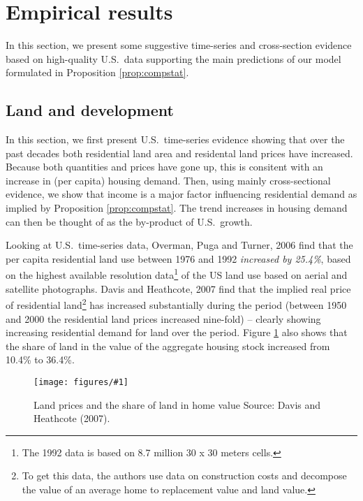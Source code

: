 \documentclass[12pt]{article}
\newcommand{\dofigure}[2]{\begin{figure}
\begin{centering}
\texttt{[image: figures/\#1]}
  \caption{#2\label{fig:#1}}
\end{centering}
\end{figure}}
\begin{document}


\section{Empirical results}\label{empirics}
In this section, we present some suggestive time-series and cross-section evidence based on high-quality U.S.~data supporting the main predictions of our model formulated in Proposition \ref{prop:compstat}.

\subsection{Land and development}
In this section, we first present U.S.~time-series evidence showing that over the past decades both residential land area and residental land prices have increased. Because both quantities and prices have gone up, this is consitent with an increase in (per capita) housing demand. Then, using mainly cross-sectional evidence, we show that income is a major factor influencing residential demand as implied by Proposition \ref{prop:compstat}. The trend increases in housing demand can then be thought of as the by-product of U.S.~growth.

Looking at U.S.~time-series data, Overman, Puga and Turner, 2006 find that the per capita residential land use between 1976 and 1992 \emph{increased by 25.4\%}, based on the highest available resolution data\footnote{The 1992 data is based on 8.7 million 30 x 30 meters cells.} of the US land use based on aerial and satellite photographs. Davis and Heathcote, 2007 find that the implied real price of residential land\footnote{To get this data, the authors use
data on construction costs and decompose the value of an
average home to replacement value and land value.} has increased substantially during the period (between 1950 and 2000 the residential land prices increased nine-fold) -- clearly showing increasing residential demand for land over the period. Figure \ref{fig:dh-shares} also shows that the share of land in the value of the aggregate housing stock increased from 10.4\% to 36.4\%.

\dofigure{dh-shares}{Land prices and the share of land in home value\newline
\small Source: Davis and Heathcote (2007).}

\end{document}
